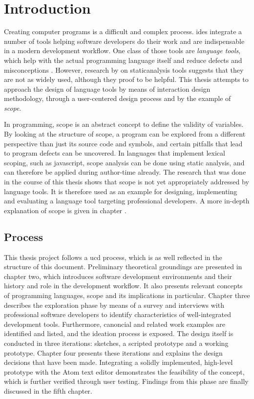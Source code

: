 \chapter{Introduction}\label{introduction}

Creating computer programs is a difficult and complex process.
\glspl{ide} integrate a number of tools helping software developers do
their work and are indispensable in a modern development workflow. One
class of those tools are \emph{language tools}, which help with the
actual programming language itself and reduce defects and misconceptions
\cite{hidayat}. However, research by  on
\gls{staticanalysis} tools suggests that they are not as widely used,
although they proof to be helpful. This thesis attempts to approach the
design of language tools by means of interaction design methodology,
through a user-centered design process and by the example of
\emph{scope}.

In programming, scope is an abstract concept to define the validity of
variables. By looking at the structure of scope, a program can be
explored from a different perspective than just its source code and
symbols, and certain pitfalls that lead to program defects can be
uncovered. In languages that implement lexical scoping, such as
\gls{javascript}, scope analysis can be done using static analysis, and
can therefore be applied during author-time already. The research that
was done in the course of this thesis shows that scope is not yet
appropriately addressed by language tools. It is therefore used as an
example for designing, implementing and evaluating a language tool
targeting professional developers. A more in-depth explanation of scope
is given in chapter .

\section{Process}\label{process}

This thesis project follows a \acl{ucd} process, which is as well
reflected in the structure of this document. Preliminary theoretical
groundings are presented in chapter two, which introduces software
development environments and their history and role in the development
workflow. It also presents relevant concepts of programming languages,
scope and its implications in particular. Chapter three describes the
exploration phase by means of a survey and interviews with professional
software developers to identify characteristics of well-integrated
development tools. Furthermore, canoncial and related work examples are
identified and listed, and the ideation process is exposed. The design
itself is conducted in three iterations: sketches, a scripted prototype
and a working prototype. Chapter four presents these iterations and
explains the design decisions that have been made. Integrating a solidly
implemented, high-level prototype with the Atom text editor demonstrates
the feasibility of the concept, which is further verified through user
testing. Findings from this phase are finally discussed in the fifth
chapter.

